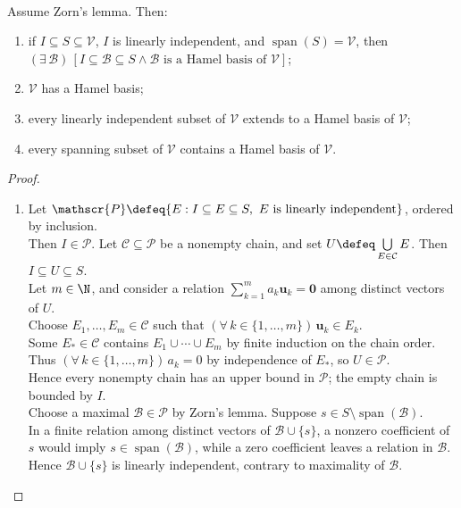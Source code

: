 \begin{theorem} \label{thm:hamel-basis-extension} \\
Assume Zorn's lemma. Then:
\begin{enumerate}[label=(\roman*)]
\setlength{\itemsep}{0pt}
\item if $I\subseteq S\subseteq\mathcal{V}$, $I$ is linearly independent, and $\operatorname{span}(S)=\mathcal{V}$, then $(\exists\,\mathcal{B})\,[I\subseteq\mathcal{B}\subseteq S\land\mathcal{B}\text{ is a Hamel basis of }\mathcal{V}]$;
\item $\mathcal{V}$ has a Hamel basis;
\item every linearly independent subset of $\mathcal{V}$ extends to a Hamel basis of $\mathcal{V}$;
\item every spanning subset of $\mathcal{V}$ contains a Hamel basis of $\mathcal{V}$.
\end{enumerate}
\begin{proof}
\begin{enumerate}[label=(\roman*)]
\setlength{\itemsep}{0pt}
\item Let $\mathscr{P}\defeq\{E:I\subseteq E\subseteq S,\ E\text{ is linearly independent}\}$, ordered by inclusion.\\
Then $I\in\mathscr{P}$. Let $\mathcal{C}\subseteq\mathscr{P}$ be a nonempty chain, and set $U\defeq\bigcup\limits_{E\in\mathcal{C}}E$. Then $I\subseteq U\subseteq S$.\\
Let $m\in\N$, and consider a relation $\sum\limits_{k=1}^{m}a_k\mathbf{u}_k=\mathbf{0}$ among distinct vectors of $U$.\\
Choose $E_1,\ldots,E_m\in\mathcal{C}$ such that $(\forall\,k\in\{1,\ldots,m\})\,\mathbf{u}_k\in E_k$.\\
Some $E_\ast\in\mathcal{C}$ contains $E_1\cup\cdots\cup E_m$ by finite induction on the chain order.\\
Thus $(\forall\,k\in\{1,\ldots,m\})\,a_k=0$ by independence of $E_\ast$, so $U\in\mathscr{P}$.\\
Hence every nonempty chain has an upper bound in $\mathscr{P}$; the empty chain is bounded by $I$.\\
Choose a maximal $\mathcal{B}\in\mathscr{P}$ by Zorn's lemma. Suppose $s\in S\setminus\operatorname{span}(\mathcal{B})$.\\
In a finite relation among distinct vectors of $\mathcal{B}\cup\{s\}$, a nonzero coefficient of $s$ would imply $s\in\operatorname{span}(\mathcal{B})$, while a zero coefficient leaves a relation in $\mathcal{B}$. Hence $\mathcal{B}\cup\{s\}$ is linearly independent, contrary to maximality of $\mathcal{B}$.\\

\end{enumerate}
\end{proof}
\end{theorem}

